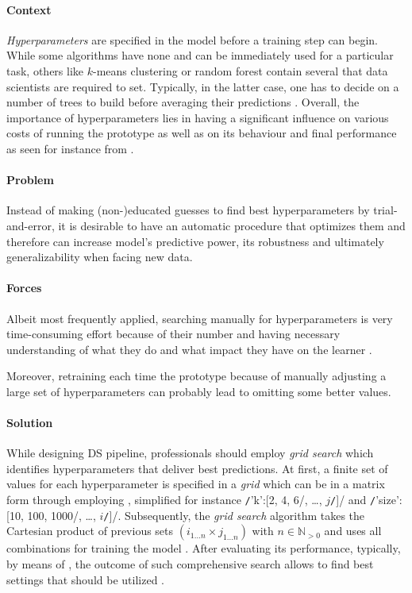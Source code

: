 \paragraph*{Context}
\emph{Hyperparameters} are specified in the model before a training step can begin.
While some algorithms have none and can be immediately used for a particular task, others like $k$-means clustering or random forest contain several that data scientists are required to set. 
Typically, in the latter case, one has to decide on a number of trees to build before averaging their predictions \parencite{DL2016Mit}. 
Overall, the importance of hyperparameters lies in having a significant influence on various costs of running the prototype as well as on its behaviour and final performance as seen for instance from .

\paragraph*{Problem}
Instead of making (non-)educated guesses to find best hyperparameters by trial-and-error, it is desirable to have an automatic procedure that optimizes them and therefore can increase model's predictive power, its robustness and ultimately generalizability when facing new data.

\paragraph*{Forces}
\begin{compactitem}
  \item Albeit most frequently applied, searching manually for hyperparameters is very time-consuming effort because of their number and having necessary understanding of what they do and what impact they have on the learner \parencite{DL2016Mit}. 
  \item Moreover, retraining each time the prototype because of manually adjusting a large set of hyperparameters can probably lead to omitting some better values.
\end{compactitem}

\paragraph*{Solution}
While designing \ac{DS} pipeline, professionals should employ \emph{grid search} which identifies hyperparameters that deliver best predictions. 
At first, a finite set of values for each hyperparameter is specified in a \emph{grid} which can be in a matrix form through employing , simplified for instance \texttt/{'k':[2, 4, 6/, \dots, $j$\texttt/]}/ and \texttt/{'size':[10, 100, 1000/, \dots, $i$\texttt/]}/.
Subsequently, the \emph{grid search} algorithm takes the Cartesian product of previous sets $(i_{1...n} \times j_{1...n})$ with $n \in \mathbb{N}_{>0}$ and uses all combinations for training the model \parencite{JakeVanderPlas2016PythonHandbook}. 
After evaluating its performance, typically, by means of , the outcome of such comprehensive search allows to find best settings that should be utilized \parencite{DL2016Mit}.

